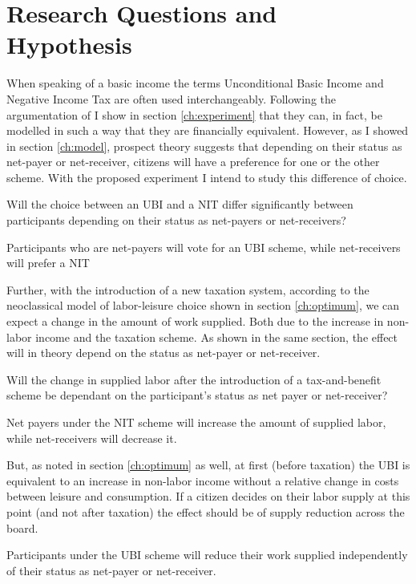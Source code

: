 \chapter{Research Questions and Hypothesis}
\label{ch:rq}

When speaking of a basic income the terms Unconditional Basic Income and Negative Income Tax are often used interchangeably. Following the argumentation of \cite{tondani2009} I show in section \ref{ch:experiment} that they can, in fact, be modelled in such a way that they are financially equivalent. However, as I showed in section \ref{ch:model}, prospect theory suggests that depending on their status as net-payer or net-receiver, citizens will have a preference for one or the other scheme. With the proposed experiment I intend to study this difference of choice.\\

\begin{req}\label{rq_scheme}
Will the choice between an UBI and a NIT differ significantly between participants depending on their status as net-payers or net-receivers?
\end{req}


\begin{hyp}\label{hyp:central}
Participants who are net-payers will vote for an UBI scheme, while net-receivers will prefer a NIT
\end{hyp}

\hfill \par

Further, with the introduction of a new taxation system, according to the neoclassical model of labor-leisure choice shown in section \ref{ch:optimum}, we can expect a change in the amount of work supplied. Both due to the increase in non-labor income and the taxation scheme. As shown in the same section, the effect will in theory depend on the status as net-payer or net-receiver.  

\begin{req}\label{rq_perf}
Will the change in supplied labor after the introduction of a tax-and-benefit scheme be dependant on the participant's status as net payer or net-receiver?
\end{req}


\begin{hyp}
Net payers under the NIT scheme will increase the amount of supplied labor, while net-receivers will decrease it.
\end{hyp}

But, as noted in section \ref{ch:optimum} as well, at first (before taxation) the UBI is equivalent to an increase in non-labor income without a relative change in costs between leisure and consumption. If a citizen decides on their labor supply at this point (and not after taxation) the effect should be of supply reduction across the board.

\begin{hyp}
Participants under the UBI scheme will reduce their work supplied independently of their status as net-payer or net-receiver.
\end{hyp}

